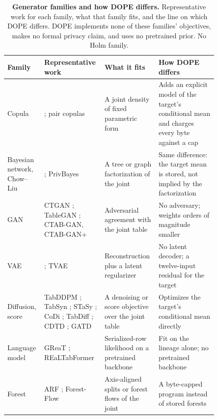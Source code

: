 \documentclass{article}
\begin{document}
\begin{table}[t]
\caption{\textbf{Generator families and how DOPE differs.} Representative work for each family, what that family fits, and the line on which DOPE differs. DOPE implements none of these families' objectives, makes no formal privacy claim, and uses no pretrained prior. No Holm family.}
\label{tab:taxonomy}
\centering\scriptsize
\begin{tabular}{@{}>{\raggedright\arraybackslash}p{0.14\linewidth}>{\raggedright\arraybackslash}p{0.22\linewidth}>{\raggedright\arraybackslash}p{0.22\linewidth}>{\raggedright\arraybackslash}p{0.27\linewidth}@{}}
\toprule
Family & Representative work & What it fits & How DOPE differs \\
\midrule
Copula & \citet{patki2016sdv}; pair copulas \citep{aas2009paircopula} & A joint density of fixed parametric form & Adds an explicit model of the target's conditional mean and charges every byte against a cap \\
Bayesian network, Chow--Liu & \citet{chow1968dependence}; PrivBayes \citep{zhang2014privbayes} & A tree or graph factorization of the joint & Same difference: the target mean is stored, not implied by the factorization \\
GAN & CTGAN \citep{xu2019ctgan}; TableGAN \citep{park2018tablegan}; CTAB-GAN, CTAB-GAN+ \citep{zhao2021ctabgan,zhao2024ctabganplus} & Adversarial agreement with the joint table & No adversary; weights orders of magnitude smaller \\
VAE & \citet{kingma2014vae}; TVAE \citep{xu2019ctgan} & Reconstruction plus a latent regularizer & No latent decoder; a twelve-input residual for the target \\
Diffusion, score & TabDDPM \citep{kotelnikov2023tabddpm}; TabSyn \citep{zhang2024tabsyn}; STaSy \citep{kim2023stasy}; CoDi \citep{lee2023codi}; TabDiff \citep{shi2025tabdiff}; CDTD \citep{mueller2025cdtd}; GATD \citep{zagardo2026gatd} & A denoising or score objective over the joint table & Optimizes the target's conditional mean directly \\
Language model & GReaT \citep{borisov2023great}; REaLTabFormer \citep{solatorio2023realtabformer} & Serialized-row likelihood on a pretrained backbone & Fit on the lineage alone; no pretrained backbone \\
Forest & ARF \citep{watson2023arf}; Forest-Flow \citep{jolicoeurmartineau2024forestdiffusion} & Axis-aligned splits or forest flows of the joint & A byte-capped program instead of stored forests \\

\end{tabular}
\end{table}
\end{document}
